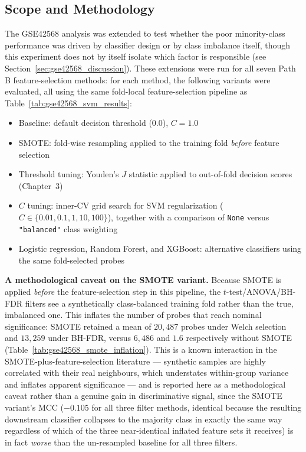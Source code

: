 \subsection{Scope and Methodology}

The GSE42568 analysis was extended to test whether the poor minority-class performance was driven by classifier design or by class imbalance itself, though this experiment does not by itself isolate which factor is responsible (see Section~\ref{sec:gse42568_discussion}). These extensions were run for all seven Path B feature-selection methods: for each method, the following variants were evaluated, all using the same fold-local feature-selection pipeline as Table~\ref{tab:gse42568_svm_results}:

\begin{itemize}
    \item Baseline: default decision threshold (0.0), $C = 1.0$
    \item SMOTE: fold-wise resampling applied to the training fold \emph{before} feature selection
    \item Threshold tuning: Youden's $J$ statistic applied to out-of-fold decision scores (Chapter~3)
    \item $C$ tuning: inner-CV grid search for SVM regularization ($C \in \{0.01, 0.1, 1, 10, 100\}$), together with a comparison of \texttt{None} versus \texttt{"balanced"} class weighting
    \item Logistic regression, Random Forest, and XGBoost: alternative classifiers using the same fold-selected probes
\end{itemize}

\textbf{A methodological caveat on the SMOTE variant.} Because SMOTE is applied \emph{before} the feature-selection step in this pipeline, the $t$-test/ANOVA/BH-FDR filters see a synthetically class-balanced training fold rather than the true, imbalanced one. This inflates the number of probes that reach nominal significance: SMOTE retained a mean of $20{,}487$ probes under Welch selection and $13{,}259$ under BH-FDR, versus $6{,}486$ and $1.6$ respectively without SMOTE (Table~\ref{tab:gse42568_smote_inflation}). This is a known interaction in the SMOTE-plus-feature-selection literature --- synthetic samples are highly correlated with their real neighbours, which understates within-group variance and inflates apparent significance --- and is reported here as a methodological caveat rather than a genuine gain in discriminative signal, since the SMOTE variant's MCC ($-0.105$ for all three filter methods, identical because the resulting downstream classifier collapses to the majority class in exactly the same way regardless of which of the three near-identical inflated feature sets it receives) is in fact \emph{worse} than the un-resampled baseline for all three filters.


